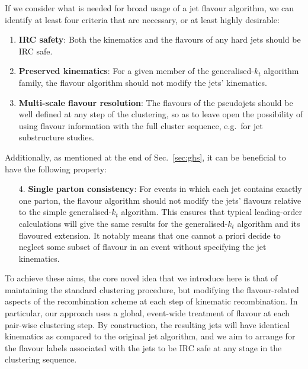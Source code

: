 \documentclass[nofootinbib,twocolumn,preprintnumbers,superscriptaddress,aps]{revtex4-2}
\begin{document}
If we consider what is needed for broad usage of a jet flavour algorithm,
we can identify at least four criteria that are necessary, or at least
highly desirable:
\begin{enumerate}
\item \textbf{IRC safety}: Both the kinematics and the flavours of any hard jets should be IRC safe.
\item \textbf{Preserved kinematics}: For a given member of the generalised-$k_t$ algorithm family,
  the flavour algorithm should not modify the jets' kinematics.
\item \textbf{Multi-scale flavour resolution}:
The flavours of the pseudojets should be well defined at any step
  of the clustering, so as to leave open the possibility of using
  flavour information with the full cluster sequence, e.g.\ for jet
  substructure studies.
\end{enumerate}
%
Additionally, as mentioned at the end of Sec.~\ref{sec:ghs}, it can be beneficial to have the following property:
%
\begin{enumerate}
\item[4.] \textbf{Single parton consistency}:   For events in which each jet contains exactly one parton,
  the flavour algorithm should not modify the jets' flavours relative
  to the simple generalised-$k_t$ algorithm.
  This ensures that typical leading-order calculations will give the
  same results for the generalised-$k_t$ algorithm and its flavoured
  extension.
  It notably means that one cannot a priori decide to neglect some
  subset of flavour in an event without specifying the jet kinematics.
\end{enumerate}

To achieve these aims,
%
the core novel idea that we introduce here is that of maintaining the
standard clustering procedure, but modifying the flavour-related
aspects of the recombination scheme at each step of kinematic
recombination.
%
In particular, our approach uses a global, event-wide treatment of
flavour at each pair-wise clustering step.
%
By construction, the resulting jets will have identical kinematics as
compared to the original jet algorithm, and we aim to arrange for
the flavour labels associated with the jets to be IRC safe at any stage in the clustering sequence.
\end{document}
